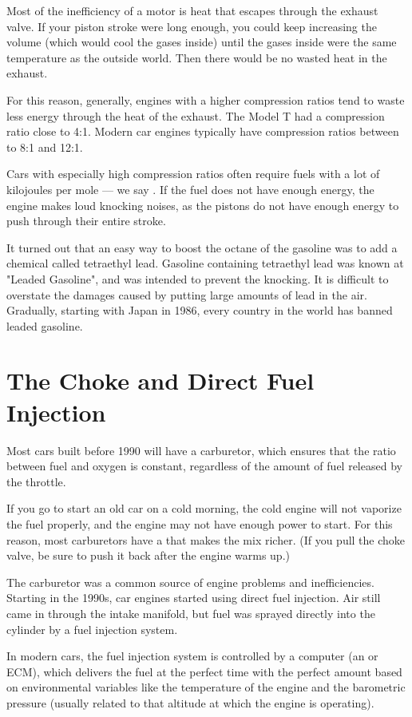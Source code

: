 Most of the inefficiency of a motor is heat that escapes through the exhaust valve.  If your piston stroke were long enough,  you could keep increasing the volume (which would cool the gases inside) until the gases inside were the same temperature as the outside world.  Then there would be no wasted heat in the exhaust.

For this reason, generally,  engines with a higher compression ratios tend to waste less energy through the heat of the exhaust.  The Model T had a compression ratio close to 4:1.  Modern car engines typically have compression ratios between to 8:1 and 12:1.  

Cars with especially high compression ratios often require fuels with a lot of kilojoules per mole --- we say .   If the fuel does not have enough energy,  the engine makes loud knocking noises, as the pistons do not have enough energy to push through their entire stroke.

It turned out that an easy way to boost the octane of the gasoline was to add a chemical called tetraethyl lead.  Gasoline containing tetraethyl lead was known at "Leaded Gasoline", and was intended to prevent the knocking.   It is difficult to overstate the damages caused by putting large amounts of lead in the air.  Gradually, starting with Japan in 1986, every country in the world has banned leaded gasoline.

\section{The Choke and Direct Fuel Injection}

Most cars built before 1990 will have a carburetor,  which ensures that the ratio between fuel and oxygen is constant, regardless of the amount of fuel released by the throttle.   

If you go to start an old car on a cold morning,  the cold engine will not vaporize the fuel properly, and the engine may not have enough power to start.   For this reason,  most carburetors have a  that makes the mix richer.  (If you pull the choke valve,  be sure to push it back after the engine warms up.)

The carburetor was a common source of engine problems and inefficiencies.   Starting in the 1990s,  car engines started using direct fuel injection. Air still came in through the intake manifold,  but fuel was sprayed directly into the cylinder by a fuel injection system.

In modern cars,  the fuel injection system is controlled by a computer (an   or ECM), which delivers the fuel at the perfect time with the perfect amount based on environmental variables like the temperature of the engine and the barometric pressure (usually related to that altitude at which the engine is operating).


